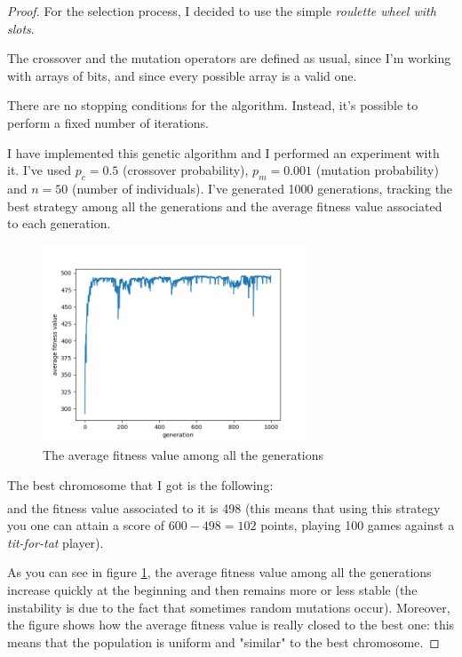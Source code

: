 \begin{proof}
    For the selection process, I decided to use the simple \emph{roulette wheel with slots}.\par
    The crossover and the mutation operators are defined as usual, since I'm working with arrays of bits, and since every possible array is a valid one.\par
    There are no stopping conditions for the algorithm. Instead, it's possible to perform a fixed number of iterations.\par
    I have implemented this genetic algorithm and I performed an experiment with it. I've used \(p_c = 0.5\) (crossover probability), \(p_m = 0.001\) (mutation probability) and \(n = 50\) (number of individuals). I've generated 1000 generations, tracking the best strategy among all the generations and the average fitness value associated to each generation.\par
    \begin{figure}
        \centering
        \includegraphics[width=0.7\textwidth]{../Images/average-fitness-value.png}
        \caption{The average fitness value among all the generations}
        \label{average-fitness-value}
    \end{figure}
    The best chromosome that I got is the following:
    \begin{align*}
        [ & 0, 0, 1, 1, 0, 1, 0, 1, 0, 0, 0, 0, 1, 1, 0, 0, 0, 0, 1, 0, \\
          & 1, 0, 0, 0, 0, 0, 1, 0, 0, 0, 0, 0, 1, 1, 1, 0, 0, 1, 1, 0, \\
          & 0, 0, 0, 0, 1, 1, 1, 0, 1, 1, 1, 1, 1, 0, 1, 0, 0, 1, 1, 0, \\
          & 1, 1, 1, 0, 0, 0, 0, 0, 0, 1 ]
    \end{align*}
    and the fitness value associated to it is 498 (this means that using this strategy you one can attain a score of \(600 - 498 = 102\) points, playing 100 games against a \emph{tit-for-tat} player).\par
    As you can see in figure \ref{average-fitness-value}, the average fitness value among all the generations increase quickly at the beginning and then remains more or less stable (the instability is due to the fact that sometimes random mutations occur). Moreover, the figure shows how the average fitness value is really closed to the best one: this means that the population is uniform and "similar" to the best chromosome.
\end{proof}